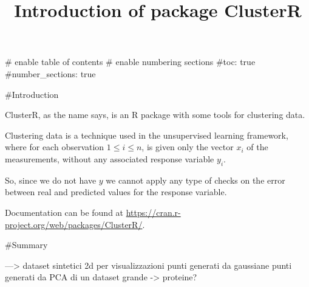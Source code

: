 \documentclass[
]{article}
\title{Introduction of package ClusterR}
\author{}
\date{\vspace{-2.5em}}
\begin{document}
\maketitle

\# enable table of contents \# enable numbering sections \#toc: true
\#number\_sections: true

\#Introduction

ClusterR, as the name says, is an R package with some tools for
clustering data.

Clustering data is a technique used in the unsupervised learning
framework, where for each observation \(1 \leq i \leq n\), is given only
the vector \(x_i\) of the measurements, without any associated response
variable \(y_i\).

So, since we do not have \(y\) we cannot apply any type of checks on the
error between real and predicted values for the response variable.

Documentation can be found at
\url{https://cran.r-project.org/web/packages/ClusterR/}.

\#Summary

---\textgreater{} dataset sintetici 2d per visualizzazioni punti
generati da gaussiane punti generati da PCA di un dataset grande
-\textgreater{} proteine?
\end{document}
